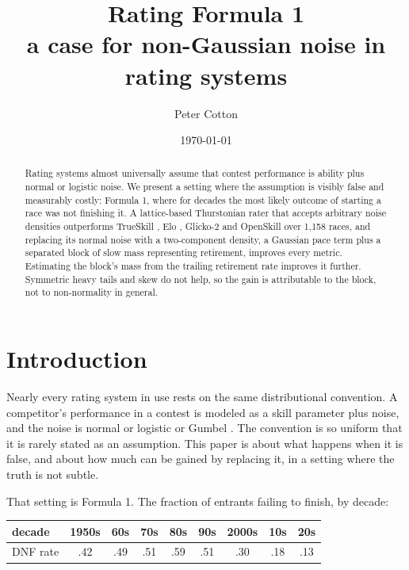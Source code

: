 \documentclass[11pt]{article}
\title{\textbf{Rating Formula 1}\\[0.4em]
\large a case for non-Gaussian noise in rating systems}
\author{Peter Cotton}
\date{\today}
\begin{document}
\maketitle

\begin{abstract}
\noindent Rating systems almost universally assume that contest performance
is ability plus normal or logistic noise. We present a setting where the
assumption is visibly false and measurably costly: Formula 1, where for
decades the most likely outcome of starting a race was not finishing it. A
lattice-based Thurstonian rater that accepts arbitrary noise densities
outperforms TrueSkill \citep{herbrich2007}, Elo \citep{elo1978},
Glicko-2 \citep{glickman2012} and OpenSkill \citep{weng2011} over
1{,}158 races, and
replacing its normal noise with a two-component density, a Gaussian pace
term plus a separated block of slow mass representing retirement, improves
every metric. Estimating the block's mass from the trailing retirement rate
improves it further. Symmetric heavy tails and skew do not help, so the
gain is attributable to the block, not to non-normality in general.
\end{abstract}

\section{Introduction}

Nearly every rating system in use rests on the same distributional
convention. A competitor's performance in a contest is modeled as a skill
parameter plus noise, and the noise is normal \citep{thurstone1927,
mosteller1951, herbrich2007} or logistic or Gumbel \citep{elo1978,
glickman1999, bradley1952, luce1959, plackett1975}. The convention is so uniform that it is
rarely stated as an assumption. This paper is about what happens when it is
false, and about how much can be gained by replacing it, in a setting where
the truth is not subtle.

That setting is Formula 1. The fraction of entrants failing to finish, by
decade:

\begin{center}
\begin{tabular}{lcccccccc}
\toprule
decade & 1950s & 60s & 70s & 80s & 90s & 2000s & 10s & 20s \\
\midrule
DNF rate & .42 & .49 & .51 & .59 & .51 & .30 & .18 & .13 \\
\bottomrule
\end{tabular}
\end{center}
\end{document}
